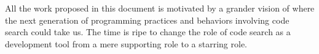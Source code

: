 \begin{itemize}
\end{itemize}

All the work proposed in this document is motivated by a grander vision of where the next generation of programming practices and behaviors involving code search could take us. The time is ripe to change the role of code search as a development tool from a mere supporting role to a starring role.